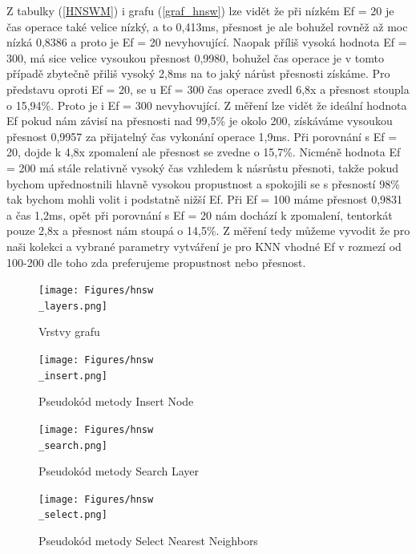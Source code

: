 \documentclass[czech,semestral,dept460,male,csharp,cpdeclaration]{diploma}
\begin{document}
		Z tabulky (\ref{HNSWM}) i grafu (\ref{graf_hnsw}) lze vidět že při nízkém Ef = 20 je čas operace také velice nízký, a to 0,413ms, přesnost je ale bohužel rovněž až moc nízká 0,8386 a proto je Ef = 20 nevyhovující. Naopak příliš vysoká hodnota Ef = 300, má sice velice vysoukou přesnost 0,9980, bohužel čas operace je v tomto případě zbytečně přiliš vysoký 2,8ms na to jaký nárůst přesnosti získáme. Pro představu oproti Ef = 20, se u Ef = 300 čas operace zvedl 6,8x a přesnost stoupla o 15,94\%. Proto je i Ef = 300 nevyhovující. Z měření lze vidět že ideální hodnota Ef pokud nám závisí na přesnosti nad 99,5\% je okolo 200, získáváme vysoukou přesnost 0,9957 za přijatelný čas vykonání operace 1,9ms. Při porovnání s Ef = 20, dojde k 4,8x zpomalení ale přesnost se zvedne o 15,7\%. Nicméně hodnota Ef = 200 má stále relativně vysoký čas vzhledem k násrůstu přesnoti, takže pokud bychom upřednostnili hlavně vysokou propustnost a spokojili se s přesností 98\% tak bychom mohli volit i podstatně nižší Ef. Při Ef = 100 máme přesnost 0,9831 a čas 1,2ms, opět při porovnání s Ef = 20 nám dochází k zpomalení, tentorkát pouze 2,8x a přesnost nám stoupá o 14,5\%. Z měření tedy můžeme vyvodit že pro naši kolekci a vybrané parametry vytváření je pro KNN vhodné Ef v rozmezí od 100-200 dle toho zda preferujeme propustnost nebo přesnost.
		
		\begin{figure}
			\centering
			\texttt{[image: Figures/hnsw\\\_layers.png]}
			\caption{Vrstvy grafu}
			\label{hnsw_layers}
		\end{figure}
		
		\begin{figure}
			\centering
			\texttt{[image: Figures/hnsw\\\_insert.png]}
			\caption{Pseudokód metody Insert Node}
			\label{hnsw_insert}
		\end{figure}
		
		\begin{figure}
			\centering
			\texttt{[image: Figures/hnsw\\\_search.png]}
			\caption{Pseudokód metody Search Layer}
			\label{hnsw_search}
		\end{figure}
	
		\begin{figure}
			\centering
			\texttt{[image: Figures/hnsw\\\_select.png]}
			\caption{Pseudokód metody Select Nearest Neighbors}
			\label{hnsw_select}
		\end{figure}
		
\end{document}
